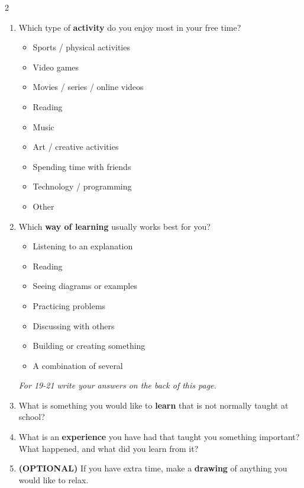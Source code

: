 \begin{minipage}{\dimexpr\textwidth+0.5cm\relax}
\begin{multicols}{2}
\begin{enumerate}
				\item Which type of \textbf{activity} do you enjoy most in your free time?
				
				\begin{itemize}[label={\raisebox{-0.1ex}{\huge$\square$}}, leftmargin=2em]
					\item Sports / physical activities
					\item Video games
					\item Movies / series / online videos
					\item Reading
					\item Music
					\item Art / creative activities
					\item Spending time with friends
					\item Technology / programming
					\item Other
				\end{itemize}
				
				\item Which \textbf{way of learning} usually works best for you?
				
				\begin{itemize}[label={\raisebox{-0.1ex}{\huge$\square$}}, leftmargin=2em]
					\item Listening to an explanation
					\item Reading
					\item Seeing diagrams or examples
					\item Practicing problems
					\item Discussing with others
					\item Building or creating something
					\item A combination of several
				\end{itemize}
				
				\begin{center}
					\textit{For 19-21 write your answers on the back of this page.}
				\end{center}
				
				\item What is something you would like to \textbf{learn} that is not normally taught at school?
				
				\item What is an \textbf{experience} you have had that taught you something important? What happened, and what did you learn from it?
				
				\item \textbf{(OPTIONAL)} If you have extra time, make a \textbf{drawing} of anything you would like to relax.
				
			\end{enumerate}
		\end{multicols}
	\end{minipage}
	
